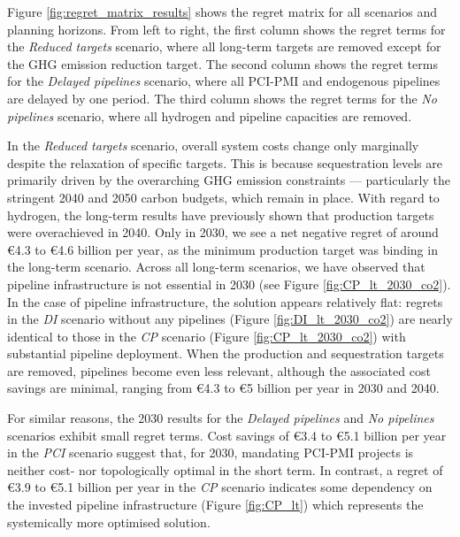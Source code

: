 \documentclass[preprint,12pt,sort&compress]{elsarticle}
\begin{document}
Figure \ref{fig:regret_matrix_results} shows the regret matrix for all scenarios and planning horizons. From left to right, the first column shows the regret terms for the \textit{Reduced targets} scenario, where all long-term targets are removed except for the GHG emission reduction target. The second column shows the regret terms for the \textit{Delayed pipelines} scenario, where all PCI-PMI and endogenous pipelines are delayed by one period. The third column shows the regret terms for the \textit{No pipelines} scenario, where all hydrogen and  pipeline capacities are removed.

In the \textit{Reduced targets} scenario, overall system costs change only marginally despite the relaxation of specific targets. This is because  sequestration levels are primarily driven by the overarching GHG emission constraints --- particularly the stringent 2040 and 2050 carbon budgets, which remain in place. With regard to hydrogen, the long-term results have previously shown that  production targets were overachieved in 2040. Only in 2030, we see a net negative regret of around \euro{4.3} to \euro{4.6} billion per year, as the minimum  production target was binding in the long-term scenario. Across all long-term scenarios, we have observed that 
 pipeline infrastructure is not essential in 2030 (see Figure \ref{fig:CP_lt_2030_co2}). In the case of  pipeline infrastructure, the solution appears relatively flat: regrets in the \textit{DI} scenario without any pipelines (Figure \ref{fig:DI_lt_2030_co2}) are nearly identical to those in the \textit{CP} scenario (Figure \ref{fig:CP_lt_2030_co2}) with substantial pipeline deployment. When the  production and  sequestration targets are removed, pipelines become even less relevant, although the associated cost savings are minimal, ranging from \euro{4.3} to \euro{5} billion per year in 2030 and 2040.

For similar reasons, the 2030 results for the \textit{Delayed pipelines} and \textit{No pipelines} scenarios exhibit small regret terms. Cost savings of \euro{3.4} to \euro{5.1} billion per year in the \textit{PCI} scenario suggest that, for 2030, mandating PCI-PMI projects is neither cost- nor topologically optimal in the short term. In contrast, a regret of \euro{3.9} to \euro{5.1} billion per year in the \textit{CP} scenario indicates some dependency on the invested pipeline infrastructure (Figure \ref{fig:CP_lt}) which represents the systemically more optimised solution.
\end{document}
